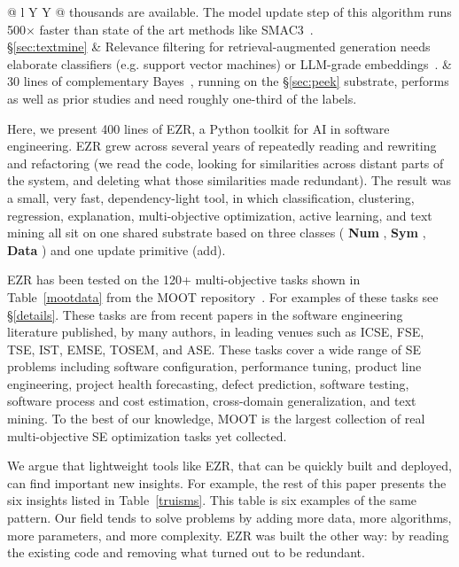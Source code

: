 \documentclass[AMA,STIX2COL]{WileyNJDv5}
\newcommand{\IT}{{\sffamily EZR}}
\newcommand{\cls}[1]{%
  \setlength{\fboxsep}{1.5pt}%
  \colorbox{clsbg}{\sffamily\bfseries{#1}}%
}
\begin{document}
\begin{table}
{\begin{center}
\begin{tabularx}{\textwidth}{@{} l Y Y @{}}
thousands are available.
The model update step of this algorithm runs  500$\times$ faster than state
of the art methods like
SMAC3~\cite{ganguly2026lowgodatalightse}. \\
\midrule
\S\ref{sec:textmine} &
Relevance filtering for retrieval-augmented generation needs
elaborate classifiers (e.g. support
vector machines) or 
LLM-grade embeddings~\cite{yu2018total,yu18}. &
30 lines of complementary Bayes~\cite{rennie2003tackling},
running on the
\S\ref{sec:peek} substrate,
performs as well as prior studies
and need   roughly
one-third of the labels.\\
\bottomrule
\end{tabularx}
\end{center}}
\end{table}


Here, we present 400 lines of \IT{}, a Python toolkit for
AI in software engineering. \IT{} grew across several years of
repeatedly reading and rewriting and refactoring (we read the
code, looking for similarities across distant parts of the
system, and deleting what those similarities made redundant).
The result was a small, very fast, dependency-light tool, in
which classification, clustering,  regression, explanation, multi-objective
optimization,
active learning, and text mining all sit on one shared substrate
based on three classes (\cls{Num}, \cls{Sym}, \cls{Data}) and one
update primitive (\textsf{add}).

\IT{} has been tested on the 120+ multi-objective tasks shown in
Table~\ref{mootdata} from the MOOT
repository~\cite{menzies2025moot}. For examples of these tasks
see \S\ref{details}. These
tasks are from recent papers in the software engineering
literature published, by many authors, in leading venues such as
ICSE, FSE, TSE, IST, EMSE, TOSEM, and ASE. These tasks cover a
wide range of SE problems including software configuration,
performance tuning, product line engineering, project health
forecasting, defect prediction, software testing, software
process and cost estimation, cross-domain generalization, and
text mining. To the best of our knowledge, MOOT is the largest
collection of real multi-objective SE optimization tasks yet
collected.


We argue that lightweight tools
like EZR, that can be quickly built and deployed,  can find important new insights.
For example,
the rest of this paper presents the six insights listed in Table~\ref{truisms}.
This table is six examples
 of the same pattern.   Our field tends to
solve problems by adding more data, more algorithms, more
parameters, and more complexity. EZR was built the other way:
by reading the existing code and removing what
turned out to be redundant.
\end{document}
